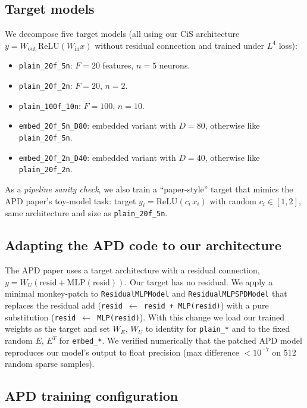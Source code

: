 \documentclass[11pt]{article}
\newcommand{\Wein}{W_{\mathrm{in}}}
\newcommand{\Weout}{W_{\mathrm{out}}}
\begin{document}
\subsection{Target models}

We decompose five target models (all using our CiS architecture
$y = \Weout\,\mathrm{ReLU}(\Wein x)$ without residual connection and
trained under $L^4$ loss):
\begin{itemize}
\item \texttt{plain\_20f\_5n}: $F=20$ features, $n=5$ neurons.
\item \texttt{plain\_20f\_2n}: $F=20$, $n=2$.
\item \texttt{plain\_100f\_10n}: $F=100$, $n=10$.
\item \texttt{embed\_20f\_5n\_D80}: embedded variant with $D=80$, otherwise
  like \texttt{plain\_20f\_5n}.
\item \texttt{embed\_20f\_2n\_D40}: embedded variant with $D=40$, otherwise
  like \texttt{plain\_20f\_2n}.
\end{itemize}
As a \emph{pipeline sanity check}, we also train a ``paper-style'' target
that mimics the APD paper's toy-model task: target $y_i = \mathrm{ReLU}(c_i\,x_i)$
with random $c_i \in [1, 2]$, same architecture and size as
\texttt{plain\_20f\_5n}.

\subsection{Adapting the APD code to our architecture}

The APD paper uses a target architecture with a residual connection,
$y = W_U(\mathrm{resid} + \mathrm{MLP}(\mathrm{resid}))$. Our target has no
residual. We apply a minimal monkey-patch to \texttt{ResidualMLPModel} and
\texttt{ResidualMLPSPDModel} that replaces the residual add
(\texttt{resid $\leftarrow$ resid + MLP(resid)}) with a pure substitution
(\texttt{resid $\leftarrow$ MLP(resid)}). With this change we load our
trained weights as the target and set $W_E$, $W_U$ to identity for
\texttt{plain\_*} and to the fixed random $E$, $E^T$ for \texttt{embed\_*}.
We verified numerically that the patched APD model reproduces our
model's output to float precision (max difference $< 10^{-7}$ on 512
random sparse samples).

\subsection{APD training configuration}
\end{document}
